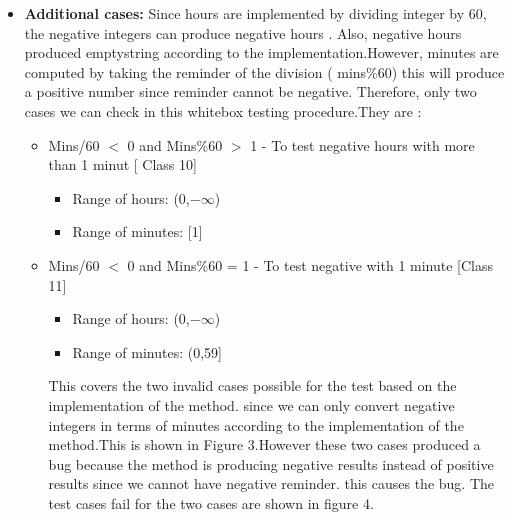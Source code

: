 \documentclass[fontsize=12pt,paper=letter,twoside]{scrartcl}
\begin{document}
\begin{itemize}
\item \textbf{Additional cases:} Since hours are implemented by dividing integer by 60, the negative integers can produce negative hours . Also, negative hours produced emptystring according to the implementation.However, minutes are computed by taking the reminder of the division ( mins\%60) this will produce a positive number since reminder cannot be negative. Therefore, only two cases we can check in this whitebox testing procedure.They are :
\newpage
 \begin{itemize}
\item Mins/60 $<$ 0 and Mins\%60 $>$ 1 - To test negative hours with more than 1 minut [ Class 10]
 \begin{itemize}
 \item Range of hours: (0,$-\infty$)
 \item Range of minutes: [1]
\end{itemize}
\item Mins/60 $<$ 0 and Mins\%60 = 1 -  To test negative with 1 minute [Class 11]
 \begin{itemize}
 \item Range of hours: (0,$-\infty$)
 \item Range of minutes: (0,59]
\end{itemize}
This covers the two invalid cases possible for the test based on the implementation of the method. since we can only convert negative integers in terms of minutes according to the implementation of the method.This is shown in Figure 3.However these two cases produced a bug because the method is producing negative results instead of positive results since we cannot have negative reminder. this causes the bug. The test cases fail for the two cases are shown in figure 4.


 \end{itemize}




\end{itemize}
\end{document}
